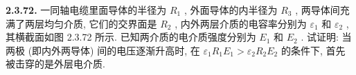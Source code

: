 \vfill
\newpage

\textbf{2.3.72.} 一同轴电缆里面导体的半径为 $R_{1}$ , 外面导体的内半径为 $R_{3}$ , 两导体间充满了两层均匀介质, 它们的交界面是 $R_{2}$ , 内外两层介质的电容率分别为 $\varepsilon_{1}$ 和 $\varepsilon_{2}$ , 其横截面如图 2.3.72 所示. 已知两介质的电介质强度分别为 $E_{1}$ 和 $E_{2}$ . 试证明: 当两极 (即内外两导体) 间的电压逐渐升高时, 在 $\varepsilon_{1} R_{1} E_{1} > \varepsilon_{2} R_{2} E_{2}$ 的条件下, 首先被击穿的是外层电介质.

\vfill
\newpage
